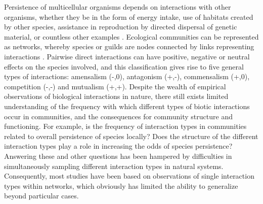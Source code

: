 Persistence of multicellular organisms depends on interactions with other organisms, whether they be in the form of energy intake, use of habitats created by other species, assistance in reproduction by directed dispersal of genetic material, or countless other examples \citep{Bascompte2007}. Ecological communities can be represented as networks, whereby species or guilds are nodes connected by links representing interactions \citep{Proulx2005}. Pairwise direct interactions can have positive, negative or neutral effects on the species involved, and this classification gives rise to five general types of interactions: amensalism (-,0), antagonism (+,-), commensalism (+,0), competition (-,-) and mutualism (+,+). Despite the wealth of empirical observations of biological interactions in nature, there still exists limited understanding of the frequency with which different types of biotic interactions occur in communities, and the consequences for community structure and functioning. For example, is the frequency of interaction types in communities related to overall persistence of species locally? Does the structure of the different interaction types play a role in increasing the odds of species persistence? Answering these and other questions has been hampered by difficulties in simultaneously sampling different interaction types in natural systems. Consequently, most studies have been based on observations of single interaction types within networks, which obviously has limited the ability to generalize beyond particular cases.

